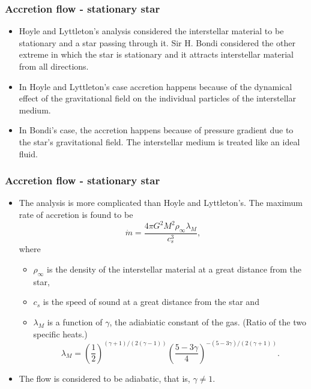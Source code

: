 \documentclass{beamer}
\begin{document}
\begin{frame}
\frametitle{Accretion flow - stationary star}
\begin{itemize}
\item Hoyle and Lyttleton's analysis considered the interstellar material to be stationary and a star passing through it. Sir H. Bondi considered the other
extreme in which the star is stationary and it attracts interstellar material from all directions. 
\item In Hoyle and Lyttleton's case accretion happens because of the dynamical effect of the gravitational field on the individual particles of the interstellar
medium.
\item In Bondi's case, the accretion happens because of pressure gradient due to the star's gravitational field. The interstellar medium is treated like an
ideal fluid.

\end{itemize}
\end{frame}

\begin{frame}
\frametitle{Accretion flow - stationary star}
\begin{itemize}
\item The analysis is more complicated than Hoyle and Lyttleton's. The maximum rate of accretion is found to be
\begin{equation}\label{e5}
\dot{m} = \frac{4\pi G^2M^2\rho_\infty \lambda_M}{c_s^3},
\end{equation}
where
\begin{itemize}
\item $\rho_\infty$ is the density of the interstellar material at a great distance from the star,
\item $c_s$ is the speed of sound at a great distance from the star and
\item $\lambda_M$ is a function of $\gamma$, the adiabiatic constant of the gas. (Ratio of the two specific heats.) 
\begin{equation}\label{e6}
\lambda_M = \left(\frac{1}{2}\right)^{(\gamma+1)/(2(\gamma-1))}\left(\frac{5-3\gamma}{4}\right)^{-(5-3\gamma)/(2(\gamma+1))}.
\end{equation}
\end{itemize}
\item The flow is considered to be adiabatic, that is, $\gamma \ne 1$.
\end{itemize}
\end{frame}
\end{document}

